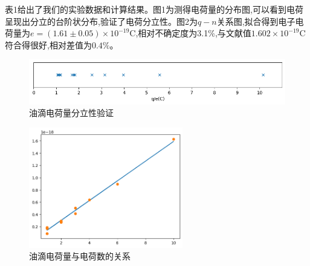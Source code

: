 \documentclass[UTF8]{ctexart}
\begin{document}
表1给出了我们的实验数据和计算结果。图1为测得电荷量的分布图,可以看到电荷呈现出分立的台阶状分布,验证了电荷分立性。图2为$q-n$关系图,拟合得到电子电荷量为$e=(1.61\pm 0.05)\times 10^{-19}\mathrm{C}$,相对不确定度为3.1\%,与文献值$1.602\times10^{-19}\mathrm{C}$符合得很好,相对差值为$0.4\%$。

\begin{figure}[htbp]
\centering
\includegraphics[width=1\textwidth]{charge_dist.png}
\caption{油滴电荷量分立性验证}
\end{figure}

\begin{figure}[htbp]
\centering
\includegraphics[width=0.6\textwidth]{q_vs_n.png}
\caption{油滴电荷量与电荷数的关系}
\end{figure}
\end{document}
